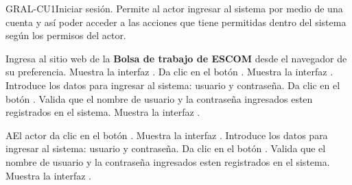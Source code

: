 
\begin{UseCase}{GRAL-CU1}{Iniciar sesión.}{
	Permite al actor ingresar al sistema por medio de una cuenta y así poder acceder a las
	acciones que tiene permitidas dentro del sistema según los permisos del actor.
}
\end{UseCase}

\begin{UCtrayectoria}
	\UCpaso [\UCactor] Ingresa al sitio web de la \textbf{Bolsa de trabajo de ESCOM} desde el navegador de su preferencia.
    \UCpaso [\UCsist] Muestra la interfaz .
	\UCpaso [\UCactor] Da clic en el botón . 
	\UCpaso [\UCsist] Muestra la interfaz .
	\UCpaso [\UCactor] Introduce los datos para ingresar al sistema: usuario y contraseña.\label{gral-01-1}
	\UCpaso [\UCactor] Da clic en el botón . 
    \UCpaso [\UCsist] Valida que el nombre de usuario y la contraseña ingresados esten registrados en el sistema.
    \UCpaso [\UCsist] Muestra la interfaz .
\end{UCtrayectoria}

\begin{UCtrayectoriaA}{A}{El actor da clic en el botón .}
	\UCpaso [\UCsist] Muestra la interfaz .
	\UCpaso [\UCactor] Introduce los datos para ingresar al sistema: usuario y contraseña.\label{gral-01-2}
	\UCpaso [\UCactor] Da clic en el botón . 
    \UCpaso [\UCsist] Valida que el nombre de usuario y la contraseña ingresados esten registrados en el sistema. 
    \UCpaso [\UCsist] Muestra la interfaz .
\end{UCtrayectoriaA} 


